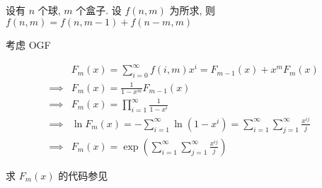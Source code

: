 设有 \(n\) 个球, \(m\) 个盒子. 设 \(f(n,m)\) 为所求, 则 \(f(n,m)=f(n,m-1)+f(n-m,m)\)

考虑 OGF

\[
    \begin{aligned}
                 & F_m(x) =\sum_{i=0}^{\infty}f(i,m)x^i =F_{m-1}(x)+x^m F_m(x)                                        \\
        \implies & F_m(x)=\frac{1}{1-x^m}F_{m-1}(x)                                                                   \\
        \implies & F_m(x)=\prod_{i=1}^{\infty}\frac{1}{1-x^i}                                                         \\
        \implies & \ln F_m(x)=-\sum_{i=1}^{\infty}\ln(1-x^i) =\sum_{i=1}^{\infty}\sum_{j=1}^{\infty} \frac{x^{ij}}{j} \\
        \implies & F_m(x)=\exp\left(\sum_{i=1}^{\infty}\sum_{j=1}^{\infty} \frac{x^{ij}}{j}\right)
    \end{aligned}
\]

求 \(F_m(x)\) 的代码参见 
